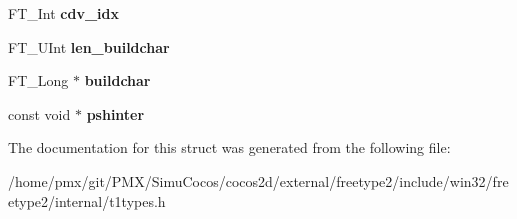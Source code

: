 \begin{DoxyCompactItemize}
F\+T\+\_\+\+Int {\bfseries cdv\+\_\+idx}
\item 
\mbox{\label{structT1__FaceRec___a75554021d0baddb1c64f69fd8dbde86b}} 
F\+T\+\_\+\+U\+Int {\bfseries len\+\_\+buildchar}
\item 
\mbox{\label{structT1__FaceRec___a14fda104833a9e1092692863c892486d}} 
F\+T\+\_\+\+Long $\ast$ {\bfseries buildchar}
\item 
\mbox{\label{structT1__FaceRec___a34795c5b418dd0b19ce726b156bb95f0}} 
const void $\ast$ {\bfseries pshinter}
\end{DoxyCompactItemize}


The documentation for this struct was generated from the following file\+:\begin{DoxyCompactItemize}
\item 
/home/pmx/git/\+P\+M\+X/\+Simu\+Cocos/cocos2d/external/freetype2/include/win32/freetype2/internal/t1types.\+h\end{DoxyCompactItemize}
